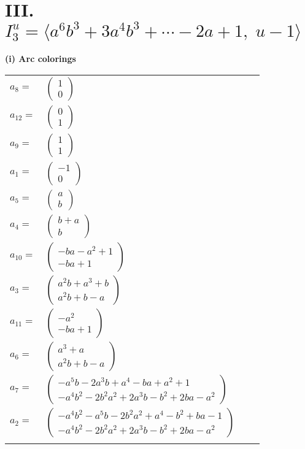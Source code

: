 \documentclass[1p]{elsarticle_modified}
\theoremstyle{definition}
\begin{document}
\centering \section*{III. $I^u_{3}= \langle a^6 b^3+3 a^4 b^3+\cdots-2 a+1,\;u-1 \rangle$}
\flushleft \textbf{(i) Arc colorings}\\
\begin{tabular}{m{7pt} m{180pt} m{7pt} m{180pt} }
\flushright $a_{8}=$&$\begin{pmatrix}1\\0\end{pmatrix}$ \\
\flushright $a_{12}=$&$\begin{pmatrix}0\\1\end{pmatrix}$ \\
\flushright $a_{9}=$&$\begin{pmatrix}1\\1\end{pmatrix}$ \\
\flushright $a_{1}=$&$\begin{pmatrix}-1\\0\end{pmatrix}$ \\
\flushright $a_{5}=$&$\begin{pmatrix}a\\b\end{pmatrix}$ \\
\flushright $a_{4}=$&$\begin{pmatrix}b+a\\b\end{pmatrix}$ \\
\flushright $a_{10}=$&$\begin{pmatrix}- b a- a^2+1\\- b a+1\end{pmatrix}$ \\
\flushright $a_{3}=$&$\begin{pmatrix}a^2 b+a^3+b\\a^2 b+b- a\end{pmatrix}$ \\
\flushright $a_{11}=$&$\begin{pmatrix}- a^2\\- b a+1\end{pmatrix}$ \\
\flushright $a_{6}=$&$\begin{pmatrix}a^3+a\\a^2 b+b- a\end{pmatrix}$ \\
\flushright $a_{7}=$&$\begin{pmatrix}- a^5 b-2 a^3 b+a^4- b a+a^2+1\\- a^4 b^2-2 b^2 a^2+2 a^3 b- b^2+2 b a- a^2\end{pmatrix}$ \\
\flushright $a_{2}=$&$\begin{pmatrix}- a^4 b^2- a^5 b-2 b^2 a^2+a^4- b^2+b a-1\\- a^4 b^2-2 b^2 a^2+2 a^3 b- b^2+2 b a- a^2\end{pmatrix}$\\&\end{tabular}
\end{document}
